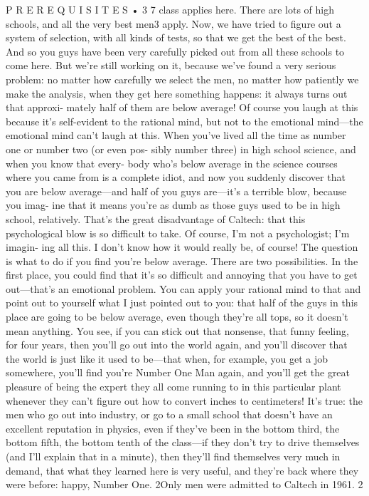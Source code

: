 \documentclass[10pt,oneside]{article}
\begin{document}
P R E R E Q U I S I T E S • 3 7 class applies here. There are lots of high schools, and all the very best men3 apply. Now, we have tried to figure out a system of selection, with all kinds of tests, so that we get the best of the best. And so you guys have been very carefully picked out from all these schools to come here. But we’re still working on it, because we’ve found a very serious problem: no matter how carefully we select the men, no matter how patiently we make the analysis, when they get here something happens: it always turns out that approxi- mately half of them are below average! Of course you laugh at this because it’s self-evident to the rational mind, but not to the emotional mind---the emotional mind can’t laugh at this. When you’ve lived all the time as number one or number two (or even pos- sibly number three) in high school science, and when you know that every- body who’s below average in the science courses where you came from is a complete idiot, and now you suddenly discover that you are below average---and half of you guys are---it’s a terrible blow, because you imag- ine that it means you’re as dumb as those guys used to be in high school, relatively. That’s the great disadvantage of Caltech: that this psychological blow is so difficult to take. Of course, I’m not a psychologist; I’m imagin- ing all this. I don’t know how it would really be, of course! The question is what to do if you find you’re below average. There are two possibilities. In the first place, you could find that it’s so difficult and annoying that you have to get out---that’s an emotional problem. You can apply your rational mind to that and point out to yourself what I just pointed out to you: that half of the guys in this place are going to be below average, even though they’re all tops, so it doesn’t mean anything. You see, if you can stick out that nonsense, that funny feeling, for four years, then you’ll go out into the world again, and you’ll discover that the world is just like it used to be---that when, for example, you get a job somewhere, you’ll find you’re Number One Man again, and you’ll get the great pleasure of being the expert they all come running to in this particular plant whenever they can’t figure out how to convert inches to centimeters! It’s true: the men who go out into industry, or go to a small school that doesn’t have an excellent reputation in physics, even if they’ve been in the bottom third, the bottom fifth, the bottom tenth of the class---if they don’t try to drive themselves (and I’ll explain that in a minute), then they’ll find themselves very much in demand, that what they learned here is very useful, and they’re back where they were before: happy, Number One. 2Only men were admitted to Caltech in 1961. 2\par
\end{document}
